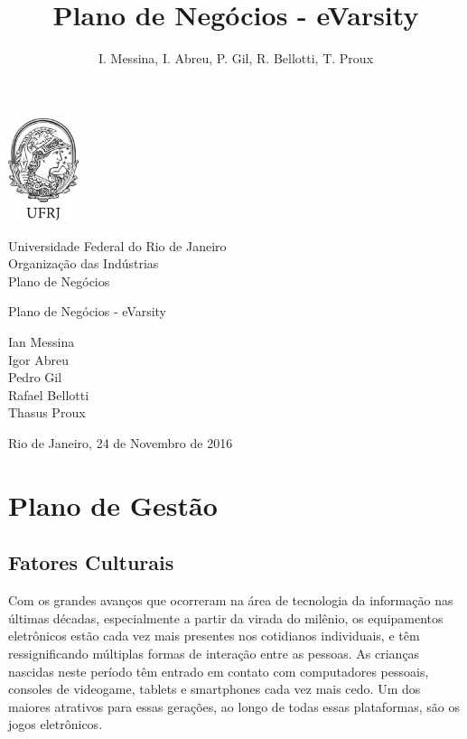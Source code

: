 \documentclass[a4paper, 12pt]{paper}
\author{I. Messina, I. Abreu, P. Gil, R. Bellotti, T. Proux}
\title{Plano de Negócios - eVarsity}
\begin{document}
    \begin{titlepage}
    	\begin{minipage}[c][3cm][c]{3cm}
    		\includegraphics[height=3cm]{img/ufrj_logo.png}
    	\end{minipage}
    	\begin{minipage}[c][3cm][c]{10cm}
    		Universidade Federal do Rio de Janeiro \\
    		Organização das Indústrias \\
    		Plano de Negócios
    	\end{minipage}
    	\begin{center}
    		\vspace{95pt}

    		\huge{Plano de Negócios - eVarsity}
    		\vspace{260pt}
    	\end{center}

    	\begin{center}
            Ian Messina \\
            Igor Abreu\\
            Pedro Gil\\
            Rafael Bellotti\\
            Thasus Proux\\
    	\end{center}

    	\begin{center}
    		\vspace{\fill}
    		Rio de Janeiro, 24 de Novembro de 2016
    	\end{center}
    \end{titlepage}
\newpage
\tableofcontents
\listoffigures
\newpage

\section{Plano de Gestão}
\subsection{Fatores Culturais}


Com os grandes avanços que ocorreram na área de tecnologia da informação nas últimas décadas, especialmente a partir da virada do milênio, os equipamentos eletrônicos estão cada vez mais presentes nos cotidianos individuais, e têm ressignificando múltiplas formas de interação entre as pessoas. As crianças nascidas neste período têm entrado em contato com computadores pessoais, consoles de videogame, tablets e smartphones cada vez mais cedo. Um dos maiores atrativos para essas gerações, ao longo de todas essas plataformas, são os jogos eletrônicos.
\end{document}
